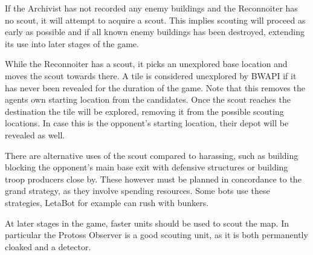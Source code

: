 If the Archivist has not recorded any enemy buildings and the Reconnoiter has no scout, it will attempt to acquire a scout. This implies scouting will proceed as early as possible and if all known enemy buildings has been destroyed, extending its use into later stages of the game.

While the Reconnoiter has a scout, it picks an unexplored base location and moves the scout towards there. A tile is considered unexplored  by BWAPI if it has never been revealed for the duration of the game. Note that this removes the agents own starting location from the candidates. Once the scout reaches the destination the tile will be explored, removing it from the possible scouting locations. In case this is the opponent's starting location, their depot will be revealed as well.

There are alternative uses of the scout compared to harassing, such as building blocking the opponent's main base exit with defensive structures or building troop producers close by. These however must be planned in concordance to the grand strategy, as they involve spending resources. Some bots use these strategies, LetaBot for example can rush with bunkers. %

At later stages in the game, faster units should be used to scout the map. In particular the Protoss Observer is a good scouting unit, as it is both permanently cloaked and a detector.